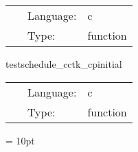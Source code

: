 \hspace{5mm}

 \begin{tabular*}{160mm}{cll} 
~ & Language:  & c \\ 
~ & Type:  & function \\ 
\end{tabular*} 


\vspace{5mm}


\hspace{5mm} testschedule\_cctk\_cpinitial 

\hspace{5mm}{\it test to see if function is placed in schedule and run at cctk\_cpinitial } 


\hspace{5mm}

 \begin{tabular*}{160mm}{cll} 
~ & Language:  & c \\ 
~ & Type:  & function \\ 
\end{tabular*} 



\vspace{5mm}\parskip = 10pt 
